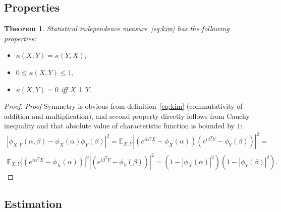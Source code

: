 \documentclass{article}
\newtheorem{theorem}{Theorem}
\begin{document}
\subsection{Properties}
\begin{theorem}
\label{thm:properties}
  Statistical independence measure~\eqref{eq:kim} has the following properties:
  \begin{itemize} 
    \item $\kappa(X,Y) = \kappa(Y,X)$,
    \item $0 \leq \kappa(X,Y) \leq 1$,
    \item $\kappa(X,Y) = 0$ iff $X\perp Y$.
   \end{itemize}    
\end{theorem}


\begin{proof}
\textit{Proof}
Symmetry is obvious from definition~\eqref{eq:kim} (commutativity of addition and multiplication), and second property directly follows from Cauchy inequality and that absolute value of characteristic function is bounded by $1$:
\begin{multline*}
|\phi_{X,Y}(\alpha, \beta)  -\phi_{X}(\alpha) \phi_{Y}(\beta)|^{2} =
\mathbb{E}_{X,Y} |( e^{i\alpha^{T}X} - \phi_{X}(\alpha) )(e^{i\beta^{T}Y}- \phi_{Y}(\beta) )|^{2} = \\
\mathbb{E}_{X,Y} |( e^{i\alpha^{T}X} - \phi_{X}(\alpha) )|^{2} |(e^{i\beta^{T}Y}- \phi_{Y}(\beta) )|^{2}  = (1 - |\phi_{X}(\alpha)|^{2}) (1 - |\phi_{Y}(\beta)|^{2}).
\end{multline*}
\end{proof}


\subsection{Estimation}
\end{document}
